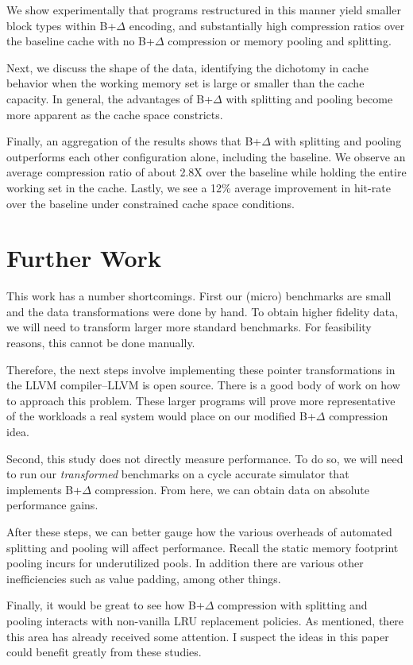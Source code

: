 \documentclass[pageno]{jpaper}
\begin{document}
We show experimentally that programs restructured in this manner yield smaller block types within B+$\Delta$ encoding, and substantially high compression ratios over the baseline cache with no B+$\Delta$ compression or memory pooling and splitting.

 Next, we discuss the shape of the data, identifying the dichotomy in cache behavior when the working memory set is large or smaller than the cache capacity. In general, the advantages of B+$\Delta$ with splitting and pooling become more apparent as the cache space constricts.

Finally, an aggregation of the results shows that B+$\Delta$ with splitting and pooling outperforms each other configuration alone, including the baseline. We observe an average compression ratio of about 2.8X over the baseline while holding the entire working set in the cache. Lastly, we see a 12\% average improvement in hit-rate over the baseline under constrained cache space conditions.


\section{Further Work}
This work has a number shortcomings. First our (micro) benchmarks are small and the data transformations were done by hand. To obtain higher fidelity data, we will need to transform larger more standard benchmarks. For feasibility reasons, this cannot be done manually.

Therefore, the next steps involve implementing these pointer transformations in the LLVM compiler--LLVM is open source. There is a good body of work on how to approach this problem\cite{mpads}. These larger programs will prove more representative of the workloads a real system would place on our modified B+$\Delta$ compression idea.

Second, this study does not directly measure performance. To do so, we will need to run our \textit{transformed} benchmarks on a cycle accurate simulator that implements B+$\Delta$ compression. From here, we can obtain data on absolute performance gains.

After these steps, we can better gauge how the various overheads of automated splitting and pooling will affect performance. Recall the static memory footprint pooling incurs for underutilized pools. In addition there are various other inefficiencies such as value padding, among other things.

Finally, it would be great to see how B+$\Delta$ compression with splitting and pooling interacts with non-vanilla LRU replacement policies. As mentioned, there this area has already received some attention\cite{carp}. I suspect the ideas in this paper could benefit greatly from these studies.




\end{document}
